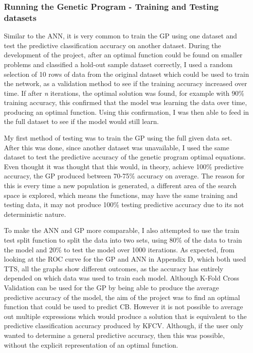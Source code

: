 \documentclass[11pt]{article}
\begin{document}
\subsubsection{Running the Genetic Program - Training and Testing datasets}\label{subsubsec:RGPTT}
Similar to the ANN, it is very common to train the GP using one dataset and test the predictive classification accuracy on another dataset. During the development of the project, after an optimal function could be found on smaller problems and classified a hold-out sample dataset correctly, I used a random selection of 10 rows of data from the original dataset which could be used to train the network, as a validation method to see if the training accuracy increased over time. If after \textit{n} iterations, the optimal solution was found, for example with 90\% training accuracy, this confirmed that the model was learning the data over time, producing an optimal function. Using this confirmation, I was then able to feed in the full dataset to see if the model would still learn.

My first method of testing was to train the GP using the full given data set. After this was done, since another dataset was unavailable, I used the same dataset to test the predictive accuracy of the genetic program optimal equations. Even thought it was thought that this would, in theory, achieve 100\% predictive accuracy, the GP produced between 70-75\% accuracy on average. The reason for this is every time a new population is generated, a different area of the search space is explored, which means the functions, may have the same training and testing data, it may not produce 100\% testing predictive accuracy due to its not deterministic nature. 

To make the ANN and GP more comparable, I also attempted to use the train test split function to split the data into two sets, using 80\% of the data to train the model and 20\% to test the model over 1000 iterations.  As expected, from looking at the ROC curve for the GP and ANN in Appendix D, which both used TTS, all the graphs show different outcomes, as the accuracy has entirely depended on which data was used to train each model. 
Although K-Fold Cross Validation can be used for the GP by being able to produce the average predictive accuracy of the model, the aim of the project was to find an optimal function that could be used to predict CB. However it is not possible to average out multiple expressions which would produce a solution that is equivalent to the predictive classification accuracy produced by KFCV. Although, if the user only wanted to determine a general predictive accuracy, then this was possible, without the explicit representation of an optimal function. 
\end{document}
